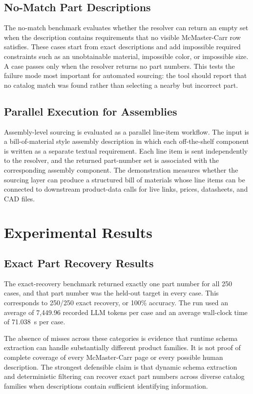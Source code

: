 \documentclass[colorlinks,upint,subscriptcorrection,varvw,hyphenate,balance,nofoot]{asmeconf}
\begin{document}
\subsection{No-Match Part Descriptions}

The no-match benchmark evaluates whether the resolver can return an empty set when the description contains requirements that no visible McMaster-Carr row satisfies. These cases start from exact descriptions and add impossible required constraints such as an unobtainable material, impossible color, or impossible size. A case passes only when the resolver returns no part numbers. This tests the failure mode most important for automated sourcing: the tool should report that no catalog match was found rather than selecting a nearby but incorrect part.

\subsection{Parallel Execution for Assemblies}
Assembly-level sourcing is evaluated as a parallel line-item workflow. The input is a bill-of-material style assembly description in which each off-the-shelf component is written as a separate textual requirement. Each line item is sent independently to the resolver, and the returned part-number set is associated with the corresponding assembly component. The demonstration measures whether the sourcing layer can produce a structured bill of materials whose line items can be connected to downstream product-data calls for live links, prices, datasheets, and CAD files.

\section{Experimental Results}

\subsection{Exact Part Recovery Results}

The exact-recovery benchmark returned exactly one part number for all 250 cases, and that part number was the held-out target in every case. This corresponds to 250/250 exact recovery, or 100\% accuracy. The run used an average of 7,449.96 recorded LLM tokens per case and an average wall-clock time of 71.038~s per case.

The absence of misses across these categories is evidence that runtime schema extraction can handle substantially different product families. It is not proof of complete coverage of every McMaster-Carr page or every possible human description. The strongest defensible claim is that dynamic schema extraction and deterministic filtering can recover exact part numbers across diverse catalog families when descriptions contain sufficient identifying information.
\end{document}
